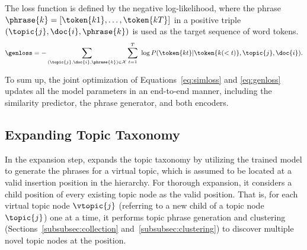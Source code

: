 The loss function is defined by the negative log-likelihood, where the phrase $\phrase{k}=[\token{k1},\ldots,\token{kT}]$ in a positive triple $(\topic{j},\doc{i},\phrase{k})$ is used as the target sequence of word tokens.
\begin{equation}
\small
\label{eq:genloss}
    \begin{split}
        \genloss &= - \sum_{(\topic{j}, \doc{i}, \phrase{k})\in\mathcal{X}} \sum_{t=1}^{T}  \ \log P(\token{kt}|\token{k(<t)},\topic{j},\doc{i}). \\
    \end{split}
\end{equation}

To sum up, the joint optimization of Equations~\eqref{eq:simloss} and \eqref{eq:genloss} updates all the model parameters in an end-to-end manner, including the similarity predictor, the phrase generator, and both encoders.


\subsection{Expanding Topic Taxonomy}
\label{subsec:expansion}
In the expansion step, \proposed expands the topic taxonomy by utilizing the trained model to generate the phrases 
for a virtual topic, which is assumed to be located at a valid insertion position in the hierarchy.
For thorough expansion, it considers a child position of every existing topic node as the valid position.
That is, for each virtual topic node $\vtopic{j}$ (referring to a new child of a topic node $\topic{j}$) {one at a time}, it performs topic phrase generation and clustering (Sections~\ref{subsubsec:collection} and~\ref{subsubsec:clustering}) to discover multiple novel topic nodes at the position.

